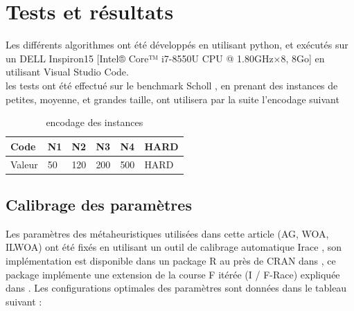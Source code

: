 \documentclass[preprint]{elsarticle}
\begin{document}
\section{Tests et résultats}
Les différents algorithmes ont été développés en utilisant python, et exécutés sur un DELL Inspiron15 [Intel® Core™ i7-8550U CPU @ 1.80GHz×8, 8Go] en utilisant Visual Studio Code. \\
les tests ont été effectué sur le benchmark Scholl \cite{Scholl}, en prenant des instances de petites, moyenne, et grandes taille, ont utilisera par la suite l’encodage suivant 
\begin{table}[h]
\centering
\begin{tabular}{l l l l l l}
\hline
\textbf{Code} & \textbf{N1} & \textbf{N2} & \textbf{N3} & \textbf{N4} & \textbf{HARD} \\
\hline
Valeur  & 50 & 120 & 200 & 500 & HARD \\
\hline
\end{tabular}
\caption{encodage des instances}
\end{table}

\subsection{Calibrage des paramètres}
Les paramètres des métaheuristiques utilisées dans cette article (AG, WOA, ILWOA) ont été fixés en utilisant un outil de calibrage automatique Irace , son implémentation est disponible dans un package R au près de CRAN dans \cite{irace}, ce package implémente une extension de la course F itérée (I / F-Race) expliquée dans \cite{survey}. 
Les configurations optimales des paramètres sont données dans le tableau suivant :\\
\end{document}
